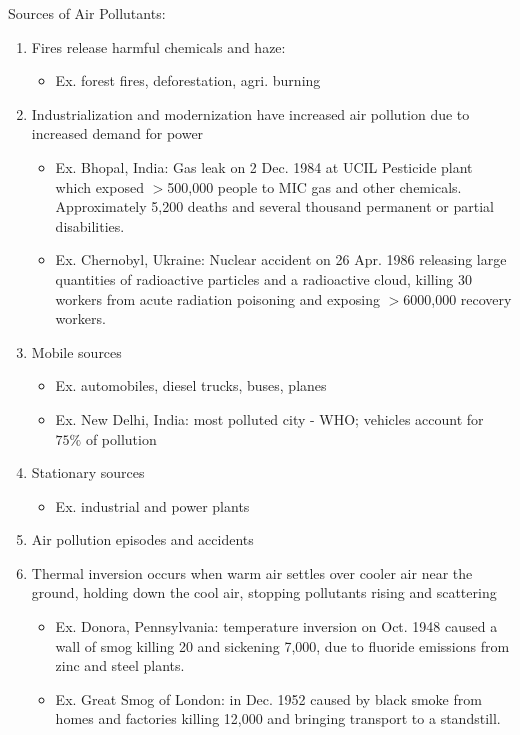 \documentclass[12pt, a4paper]{article}
\begin{document}
\begin{multicols*}{3}
\colbreak
Sources of Air Pollutants:
\begin{enumerate}[\roman*.]
  \item Fires release harmful chemicals and haze: 
    \begin{itemize}[leftmargin=*]\vspace{3pt}
      \item Ex. forest fires, deforestation, agri. burning
    \end{itemize}
  \item Industrialization and modernization have increased air pollution due to increased demand for power 
    \begin{itemize}[leftmargin=*]\vspace{3pt}
      \item Ex. Bhopal, India: Gas leak on 2 Dec. 1984 at UCIL Pesticide plant which exposed $>$500,000 people to MIC gas and other chemicals. Approximately 5,200 deaths and several thousand permanent or partial disabilities. 
      \item Ex. Chernobyl, Ukraine: Nuclear accident on 26 Apr. 1986 releasing large quantities of radioactive particles and a radioactive cloud, killing 30 workers from acute radiation poisoning and exposing $>$6000,000 recovery workers.
    \end{itemize}
  \item Mobile sources 
    \begin{itemize}[leftmargin=*]\vspace{3pt}
      \item Ex. automobiles, diesel trucks, buses, planes
      \item Ex. New Delhi, India: most polluted city - WHO; vehicles account for $75\%$ of pollution
    \end{itemize}
  \item Stationary sources 
    \begin{itemize}[leftmargin=*]\vspace{3pt}
      \item Ex. industrial and power plants 
    \end{itemize}
  \item Air pollution episodes and accidents
  \item Thermal inversion occurs when warm air settles over cooler air near the ground, holding down the cool air, stopping pollutants rising and scattering
    \begin{itemize}[leftmargin=*]\vspace{3pt}
      \item Ex. Donora, Pennsylvania: temperature inversion on Oct. 1948 caused a wall of smog killing 20 and sickening 7,000, due to fluoride emissions from zinc and steel plants.
      \item Ex. Great Smog of London: in Dec. 1952 caused by black smoke from homes and factories killing 12,000 and bringing transport to a standstill.
    \end{itemize}
\end{enumerate}


\end{multicols*}
\end{document}
